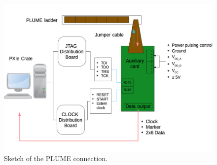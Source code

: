   \begin{figure}[!h]
    \centering
    \includegraphics[width=\textwidth]{Pictures/labTests/plumeAux.png}
    \caption{Sketch of the PLUME connection.}
    \label{fig:plumeAux}
  \end{figure}






